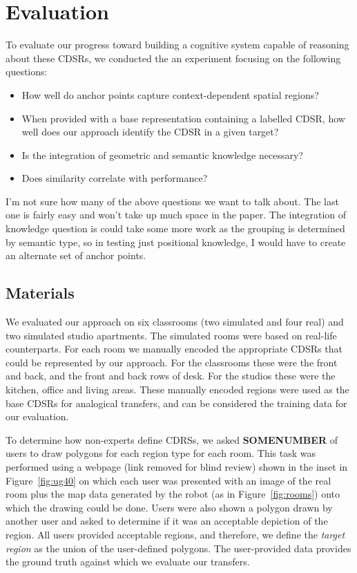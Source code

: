 \section{Evaluation}\label{sec:evaluation}

To evaluate our progress toward building a cognitive system capable of reasoning about these CDSRs, we conducted the an experiment focusing on the following questions:
\begin{itemize}
\item{How well do anchor points capture context-dependent spatial regions?}
\item{When provided with a base representation containing a labelled CDSR, how well does our approach identify the CDSR in a given target?}
\item{Is the integration of geometric and semantic knowledge necessary?}
\item{Does similarity correlate with performance?}
\end{itemize}

I'm not sure how many of the above questions we want to talk about. The last one is fairly easy and won't take up much space in the paper. The integration of knowledge question is could take some more work as the grouping is determined by semantic type, so in testing just positional knowledge,  I would have to create an alternate set of anchor points.

\subsection{Materials}

We evaluated our approach on six classrooms (two simulated and four real) and two simulated studio apartments. The simulated rooms were based on real-life counterparts. For each room we manually encoded the appropriate CDSRs that could be represented by our approach. For the classrooms these were the front and back, and the front and back rows of desk. For the studios these were the kitchen, office and living areas. These manually encoded regions were used as the base CDSRs for analogical transfers, and can be considered the training data for our evaluation. 

To determine how non-experts define CDRSs, we asked \textbf{SOMENUMBER} of users to draw polygons for each region type for each room. This task was performed using a webpage (link removed for blind review) shown in the inset in Figure~\ref{fig:ug40} on which each user was presented with an image of the real room plus the map data generated by the robot (as in Figure~\ref{fig:rooms}) onto which the drawing could be done. Users were also shown a polygon drawn by another user and asked to determine if it was an acceptable depiction of the region. All users provided acceptable regions, and therefore, we define the \textit{target region} as the union of the user-defined polygons. The user-provided data provides the ground truth against which we evaluate our transfers.

